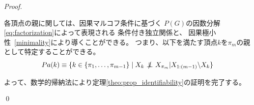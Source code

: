 \begin{proof}
\begin{quote}
\begin{enumerate}[label=(\roman*)]
    \end{enumerate}
  \end{quote}


    各頂点の親に関しては、因果マルコフ条件に基づく
    $P(G)の因数分解$\eqref{eq:factorization}によって表現される
    条件付き独立関係と、
    因果極小性~\eqref{minimality}により導くことができる。
    つまり、以下を満たす頂点$k$を$\pi_m$の親として特定することができる。
    \begin{equation*}
      Pa(k) \equiv \{ k \in \{ \pi_1, \dots, \pi_{m-1} \} \;|\;
      X_k \notindep X_{\pi_m} | X_{1:(m-1)} \backslash X_k \}
    \end{equation*}

    よって、数学的帰納法により定理\ref{theo:prop_identifiability}の証明を完了する。

  \qed
\end{proof}
